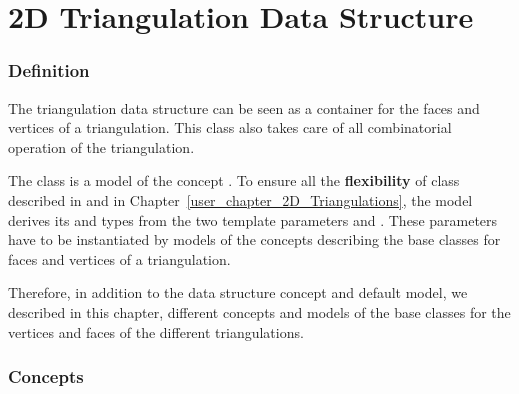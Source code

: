 

\chapter{2D Triangulation Data Structure}
\label{ref_chapter_2D_Triangulation_Data_Structure}

\subsection*{Definition}
The triangulation data structure can be seen as a container
for the faces and vertices of a triangulation. This class also takes care
of all combinatorial operation of the triangulation.

The class 
is  a model of the concept .
To ensure all the \textbf{flexibility} of class 
described in 
and in Chapter~\ref{user_chapter_2D_Triangulations}, the  model 
\ccRefName derives its  and  types
from the two template parameters  and .
These parameters 
have to be instantiated by models
of the concepts describing the base classes
for faces and vertices of a triangulation.

Therefore, in addition to the
 data structure concept and default model,
we described in this chapter,  different concepts  and models of the
base classes for the vertices and faces of the different triangulations.





\subsection*{Concepts}
\\
\\
\\

